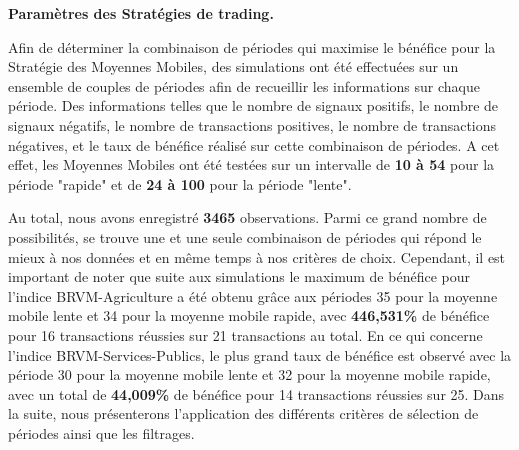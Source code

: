 \textbf{Paramètres des Stratégies de trading.}
\par{Afin de déterminer la combinaison de périodes qui maximise le bénéfice 
pour la Stratégie des Moyennes Mobiles, des simulations ont été effectuées sur 
un ensemble de couples de périodes afin de recueillir les informations sur 
chaque période. Des informations telles que le nombre de signaux positifs, le nombre de signaux
négatifs, le nombre de transactions positives, le nombre de transactions négatives,
et le taux de bénéfice réalisé sur cette combinaison de périodes.
A cet effet, les Moyennes Mobiles ont été testées sur un intervalle de \textbf{10 à 54 }
pour la période "rapide" et de \textbf{24 à 100} pour la période "lente".

Au total, nous avons enregistré \textbf{3465} observations. Parmi ce grand nombre de possibilités,
se trouve une et une seule combinaison de périodes qui répond le mieux à nos 
données et en même temps à nos critères de choix.
Cependant, il est important de noter que suite aux simulations le maximum de bénéfice pour l'indice 
BRVM-Agriculture a été obtenu grâce aux périodes 35 pour la moyenne mobile lente
et 34 pour la moyenne mobile rapide, avec \textbf{446,531\%} de bénéfice pour 16 transactions réussies sur 21
transactions au total.
En ce qui concerne l'indice BRVM-Services-Publics, le plus grand taux de bénéfice est observé avec la période 30
pour la moyenne mobile lente et 32 pour la moyenne mobile rapide, avec un total de \textbf{44,009\%} de bénéfice pour 14 transactions réussies sur 25.
Dans la suite, nous présenterons l'application des différents critères de sélection de périodes 
ainsi que les filtrages.}


